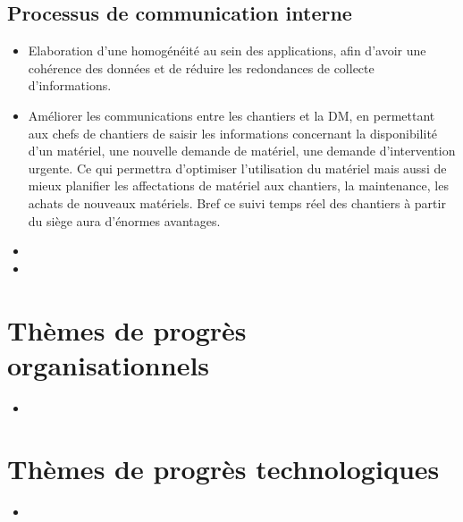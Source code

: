         \subsection{Processus de communication interne}
        \begin{itemize}
                \item Elaboration d'une homogénéité au sein des applications, afin d'avoir une cohérence des données et de réduire les redondances de collecte d'informations.
                \item Améliorer les communications entre les chantiers et la DM, en permettant aux chefs de chantiers de saisir les informations concernant la disponibilité d'un matériel, une nouvelle demande de matériel, une demande d'intervention urgente. Ce qui permettra d'optimiser l'utilisation du matériel mais aussi de mieux planifier les affectations de matériel aux chantiers, la maintenance, les achats de nouveaux matériels. Bref ce suivi temps réel des chantiers à partir du siège aura d'énormes avantages.
                \item 
                \item 
        \end{itemize}

\section{Thèmes de progrès organisationnels}
        \begin{itemize}
                \item 
        \end{itemize}

\section{Thèmes de progrès technologiques}
        \begin{itemize}
                \item 
        \end{itemize}


